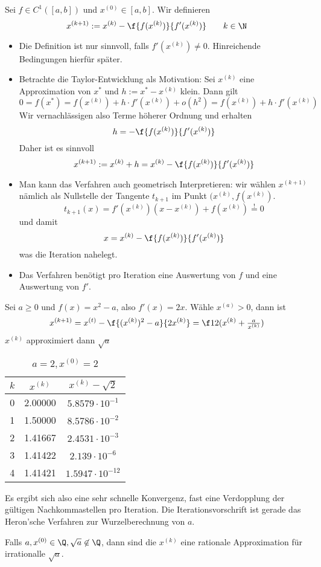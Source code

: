 \documentclass[11pt]{scrartcl}
\begin{document}
\begin{df} \label{3.3}
	Sei $f \in C^1([a,b])$ und $x^{(0)} \in [a,b]$.
	Wir definieren
	\[
		x^{(k+1)} := x^{(k)} - \f {f(x^{(k)})}{f'(x^{(k)})}
		\qquad k\in \N
	\]
	\begin{note}
		\begin{itemize}
			\item
				Die Definition ist nur sinnvoll, falls $f'(x^{(k)}) \neq 0$.
				Hinreichende Bedingungen hierfür später.
			\item
				Betrachte die Taylor-Entwicklung als Motivation:
				Sei $x^{(k)}$ eine Approximation von $x^*$ und $h:= x^* - x^{(k)}$ klein.
				Dann gilt
				\[
					0 
					= f(x^*) 
					= f(x^{(k)}) + h \cdot f'(x^{(k)}) + o(h^2)
					= f(x^{(k)}) + h \cdot f'(x^{(k)})
				\]
				Wir vernachlässigen also Terme höherer Ordnung und erhalten
				\[
					h = - \f {f(x^{(k)})}{f'(x^{(k)})}
				\]
				Daher ist es sinnvoll
				\[
					x^{(k+1)} := x^{(k)} + h = x^{(k)} - \f {f(x^{(k)})}{f'(x^{(k)})}
				\]
			\item
				Man kann das Verfahren auch geometrisch Interpretieren:
				wir wählen $x^{(k+1)}$ nämlich als Nullstelle der Tangente $t_{k+1}$ im Punkt $(x^{(k)}, f(x^{(k)})$.
				\[
					t_{k+1}(x) = f'(x^{(k)}) (x-x^{(k)}) + f(x^{(k)}) \stackrel != 0
				\]
				und damit
				\[
					x = x^{(k)} - \f {f(x^{(k)})}{f'(x^{(k)})}
				\]
				was die Iteration nahelegt.
			\item
				Das Verfahren benötigt pro Iteration eine Auswertung von $f$ und eine Auswertung von $f'$.
		\end{itemize}
	\end{note}
\end{df}

\begin{ex*}
	Sei $a \ge 0$ und $f(x) = x^2 - a$, also $f'(x) = 2x$.
	Wähle $x^{(a)} > 0$, dann ist
	\[
		x^{(k+1)} = x^{(t)} - \f {(x^{(k)})^2 - a}{2 x^{(k)}} = \f 12 (x^{(k)} + \tfrac a{x^{(k)}})
	\]
	$x^{(k)}$ approximiert dann $\sqrt a$

	\begin{table}[!ht]
		\centering
		\caption{$a=2, x^{(0)}=2$}
		\begin{tabular}{c|c|c}
			$k$ & $x^{(k)}$ & $x^{(k)} - \sqrt 2$ \\ \hline
			0 & 2.00000 & $5.8579 \cdot 10^{-1}$ \\
			1 & 1.50000 & $8.5786 \cdot 10^{-2}$ \\
			2 & 1.41667 & $2.4531 \cdot 10^{-3}$ \\
			3 & 1.41422 & $2.139 \cdot 10^{-6}$ \\
			4 & 1.41421 & $1.5947 \cdot 10^{-12}$ 
		\end{tabular}
	\end{table}

	Es ergibt sich also eine sehr schnelle Konvergenz, fast eine Verdopplung der gültigen Nachkommastellen pro Iteration.
	Die Iterationsvorschrift ist gerade das Heron'sche Verfahren zur Wurzelberechnung von $a$.

	Falls $a,x^{(0)} \in \Q, \sqrt{a} \not \in \Q$, dann sind die $x^{(k)}$ eine rationale Approximation für irrationalle $\sqrt a$.
\end{ex*}
\end{document}
